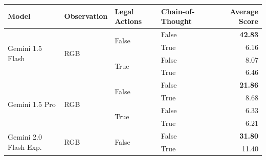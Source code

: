 \begin{tabular}{@{}llllr@{}}
    \toprule
    \textbf{Model}                                                      & \textbf{Observation}      & \textbf{Legal Actions}    & \textbf{Chain-of-Thought} & \textbf{Average Score} \\
    \midrule
    \multirow[c]{4}{*}{Gemini 1.5 Flash}                                & \multirow[c]{4}{*}{RGB}   & \multirow[c]{2}{*}{False} & False                     & \textbf{42.83} \\
                                                                        &                           &                           & True                      & 6.16 \\
                                                                        &                           & \multirow[c]{2}{*}{True}  & False                     & 8.07 \\
                                                                        &                           &                           & True                      & 6.46 \\
    \midrule                                                                                                                                                   
    \multirow[c]{4}{*}{Gemini 1.5 Pro}                                  & \multirow[c]{4}{*}{RGB}   & \multirow[c]{2}{*}{False} & False                     & \textbf{21.86} \\
                                                                        &                           &                           & True                      & 8.68 \\
                                                                        &                           & \multirow[c]{2}{*}{True}  & False                     & 6.33 \\
                                                                        &                           &                           & True                      & 6.21 \\
    \midrule                                
    \multirow[c]{4}{*}{Gemini 2.0 Flash Exp.}                           & \multirow[c]{4}{*}{RGB}   & \multirow[c]{2}{*}{False} & False                     & \textbf{31.80} \\
                                                                        &                           &                           & True                      & 11.40 \\

\end{tabular}
